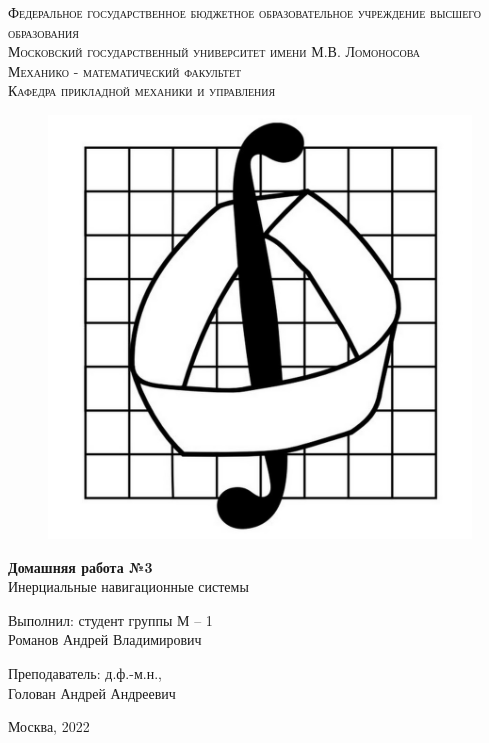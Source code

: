 \documentclass[a4paper,14pt]{article}
\theoremstyle{plain} %
\theoremstyle{definition} %
\theoremstyle{remark} %
\begin{document}
\begin{center}
    {\textsc{Федеральное государственное бюджетное образовательное
            учреждение высшего образования
        }}\\
    {\textsc{Московский государственный университет имени М.В. Ломоносова
    }} \\
    \vspace{0.2cm}
    {\textsc{Механико - математический факультет}}\\
    \vspace{0.2cm}
    {\textsc{Кафедра прикладной механики и управления}}\\
    \hfill \break
    \begin{figure}[h!]
        \centering
        \includegraphics[width=0.30\linewidth]{emblema}
        \label{fig:emblema}
    \end{figure}
    \hfill \break
    \hfill \break
    \large{\textbf{Домашняя работа №3}\\
        \hfill \break Инерциальные навигационные системы
    }
\end{center}

\hfill \break
\hfill \break
\begin{flushright}
    {
        Выполнил: студент группы М -- 1 \\ Романов Андрей Владимирович}
\end{flushright}

\begin{flushright}
    {
        Преподаватель: д.ф.-м.н., \\ Голован Андрей Андреевич}
\end{flushright}
\hfill \break
\hfill \break
\begin{center} {Москва, 2022} \end{center}
\end{document}
